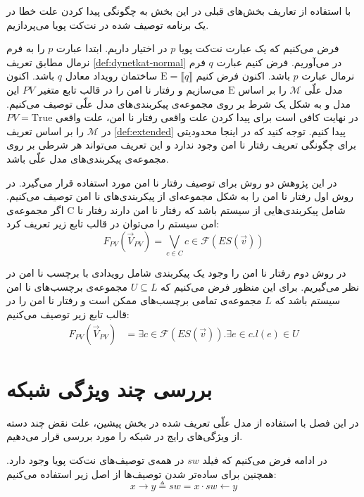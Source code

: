 \documentclass[
msc,
irfonts
]{./tex/tehran-thesis}
\newcommand{\پ}{پروژه/پایان‌نامه/رساله }
\theoremstyle{definition}
\theoremstyle{theorem}
\theoremstyle{definition}
\numberwithin{algorithm}{chapter}
\newcommand{\T}{\mathrm{True}}
\newcommand{\sem}[1]{\llbracket #1 \rrbracket}
\newcommand{\la}{\leftarrow}
\newcommand{\ra}{\rightarrow}
\newcommand{\mc}[1]{\mathcal{#1}}
\newcommand{\mr}[1]{\mathrm{#1}}
\newcommand{\f}[1]{F_{#1}(\vec V_{#1})}
\begin{document}
با استفاده از تعاریف بخش‌های قبلی در این بخش به چگونگی پیدا کردن علت خطا در یک برنامه توصیف شده در نت‌کت پویا می‌پردازیم.

فرض می‌کنیم که یک عبارت نت‌کت پویا
$p$
در اختیار داریم.
ابتدا عبارت
$p$
را به فرم نرمال مطابق تعریف 
\ref{def:dynetkat-normal}
در می‌آوریم.
فرض کنیم عبارت 
$q$
فرم نرمال
عبارت 
$p$
باشد.
اکنون فرض کنیم 
$\mr{E} = \sem{q}$
ساختمان رویداد معادل 
$q$
باشد.
اکنون مدل علّی 
$\mc{M}$
را بر اساس
$\mr{E}$
می‌سازیم و رفتار نا امن را در قالب تابع متغیر
$PV$
این مدل و به شکل یک شرط بر روی مجموعه‌ی پیکربندی‌های مدل علّی توصیف می‌کنیم.
در نهایت کافی است برای پیدا کردن علت واقعی رفتار نا امن، علت واقعی 
$PV = \T$
در 
$\mc{M}$
را بر اساس تعریف 
\ref{def:extended}
پیدا کنیم.
توجه کنید که در اینجا محدودیتی برای چگونگی تعریف رفتار نا امن وجود ندارد و این تعریف می‌تواند هر شرطی بر روی مجموعه‌ی پیکر‌بندی‌های مدل علّی باشد.

در این پژوهش دو روش برای توصیف رفتار نا امن مورد استفاده قرار می‌گیرد.
در روش اول رفتار نا امن را به شکل مجموعه‌ای از پیکر‌بندی‌های
نا امن توصیف می‌کنیم.
اگر مجموعه‌ی 
C
شامل پیکربندی‌هایی از سیستم باشد که رفتار نا امن دارند
رفتار نا امن سیستم را می‌توان در قالب تابع زیر تعریف کرد:
\begin{equation}
    \label{eq:unsafe}
    \f{PV} = \bigvee_{c \in C} c \in \mc{F}(ES(\vec v))
\end{equation}

در روش دوم رفتار نا امن را وجود یک پیکربندی شامل رویدادی 
با برچسب نا امن در نظر می‌گیریم.
برای این منظور فرض می‌کنیم که 
$U \subseteq L$
مجموعه‌ی برچسب‌های نا امن سیستم باشد که 
$L$
مجموعه‌ی تمامی برچسب‌های ممکن است و رفتار نا امن را در قالب تابع
زیر توصیف می‌کنیم:
\begin{align*}
    \f{PV} & = \exists c \in \mc{F}(ES(\vec v)).\exists e \in c.
    l(e) \in U
\end{align*}



 
\section{بررسی چند‌ ویژگی شبکه}
\label{section:examples}
در این فصل با استفاده از مدل علّی تعریف شده در بخش پیشین، علت نقض چند دسته از ویژگی‌های رایج در شبکه را مورد بررسی قرار می‌دهیم.

در ادامه فرض‌ می‌کنیم که فیلد
$sw$
در همه‌ی توصیف‌های نت‌کت پویا وجود دارد.
همچنین برای ساده‌تر شدن توصیف‌ها از اصل زیر استفاده می‌کنیم:
\begin{equation*}
    x \ra y \triangleq sw = x \cdot sw \la y
\end{equation*}
\end{document}
